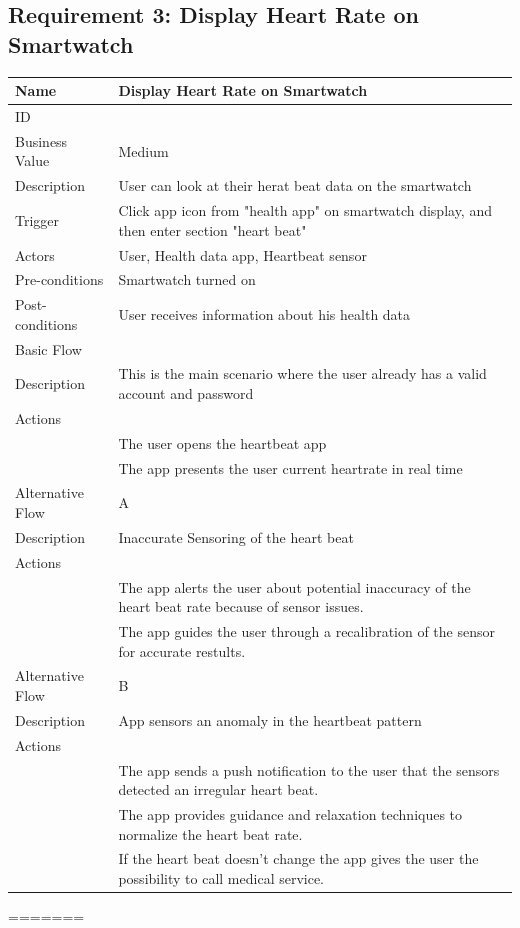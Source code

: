 \documentclass{article}
\begin{document}
	\subsection{Requirement 3: Display Heart Rate on Smartwatch}
		\begin{center}
			\begin{tabularx}{1.0\textwidth}{|>{\raggedright\arraybackslash}p{}|>{\raggedright\arraybackslash}X|}
				\hline
				Name             & Display Heart Rate on Smartwatch \\ \hline
				ID               & 3 \\ \hline
				Business Value   & Medium \\ \hline
				Description      & User can look at their herat beat data on the smartwatch \\ \hline
				Trigger          & Click app icon from "health app" on smartwatch display, and then enter section "heart beat" \\ \hline
				Actors           & User, Health data app, Heartbeat sensor \\ \hline
				Pre-conditions   & Smartwatch turned on \\ \hline
				Post-conditions  & User receives information about his health data \\ \hline
				Basic Flow       & \\ \hline
								Description & This is the main scenario where the user already has a valid account and password \\ \hline
								Actions & \\ \hline
								1 & The user opens the heartbeat app \\ \hline
								2 & The app presents the user current heartrate in real time \\ \hline
				Alternative Flow & A \\ \hline
								Description & Inaccurate Sensoring of the heart beat \\ \hline
								Actions & \\ \hline
								1 & The app alerts the user about potential inaccuracy of the heart beat rate because of sensor issues. \\ \hline
								2 & The app guides the user through a recalibration of the sensor for accurate restults.  \\ \hline
				Alternative Flow & B \\ \hline
								Description & App sensors an anomaly in the heartbeat pattern  \\ \hline
								Actions & \\ \hline
								1 & The app sends a push notification to the user that the sensors detected an irregular heart beat. \\ \hline
								2 & The app provides guidance and relaxation techniques to normalize the heart beat rate. \\ \hline
								3 & If the heart beat doesn't change the app gives the user the possibility to call medical service. \\ \hline
			\end{tabularx}
		\end{center}
	\newpage
=======
\end{document}
